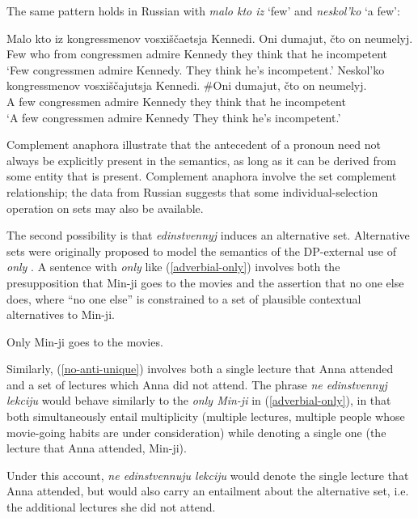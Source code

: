 The same pattern holds in Russian with \textit{malo kto iz} `few' and \textit{neskol'ko} `a few':

\begin{exe}
	\ex \gll Malo kto iz kongressmenov vosxi\v{s}\v{c}aetsja Kennedi. Oni dumajut, \v{c}to on neumelyj.\\
	Few who from congressmen admire Kennedy they think that he incompetent\\
	\glt `Few congressmen admire Kennedy. They think he's incompetent.'
	\ex \gll Neskol'ko kongressmenov vosxi\v{s}\v{c}ajutsja Kennedi. \#Oni dumajut, \v{c}to on neumelyj.\\
	{A few} congressmen admire Kennedy they think that he incompetent\\
	\glt `A few congressmen admire Kennedy They think he's incompetent.'
\end{exe}

Complement anaphora illustrate that the antecedent of a pronoun need not always be explicitly present in the semantics, as long as it can be derived from some entity that is present. Complement anaphora involve the set complement relationship; the data from Russian suggests that some individual-selection operation on sets may also be available.

The second possibility is that \textit{edinstvennyj} induces an alternative set. Alternative sets were originally proposed to model the semantics of the DP-external use of \textit{only} \citep{rooth85, rooth92}.
A sentence with \textit{only} like (\ref{adverbial-only}) involves both the presupposition that Min-ji goes to the movies and the assertion that no one else does, where ``no one else'' is constrained to a set of plausible contextual alternatives to Min-ji.

\begin{exe}
	\ex \label{adverbial-only} Only Min-ji goes to the movies.
\end{exe}

Similarly, (\ref{no-anti-unique}) involves both a single lecture that Anna attended and a set of lectures which Anna did not attend. The phrase \textit{ne edinstvennyj lekciju} would behave similarly to the \textit{only Min-ji} in (\ref{adverbial-only}), in that both simultaneously entail multiplicity (multiple lectures, multiple people whose movie-going habits are under consideration) while denoting a single one (the lecture that Anna attended, Min-ji).

Under this account, \textit{ne edinstvennuju lekciju} would denote the single lecture that Anna attended, but would also carry an entailment about the alternative set, i.e. the additional lectures she did not attend.

